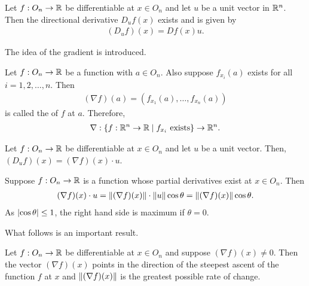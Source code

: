 \begin{theorem}
    Let $f:O_{n} \to \mathbb{R}$ be differentiable at $x \in O_{n}$ and let $u$ be a unit vector in $\mathbb{R}^{n}$. Then the directional derivative $D_{u}f(x)$ exists and is given by
    \begin{align}
        (D_{u}f)(x) = Df(x)u.
    \end{align}
\end{theorem}

The idea of the gradient is introduced.

\begin{definition}
    Let $f:O_{n} \to \mathbb{R}$ be a function with $a \in O_{n}$. Also suppose $f_{x_{i}}(a)$ exists for all $i = 1,2,\ldots,n$. Then
    \begin{align}
        (\nabla f)(a) = (f_{x_{1}}(a),\ldots,f_{x_{n}}(a))
    \end{align}
    is called the  of $f$ at $a$. Therefore,
    \begin{align}
        \nabla:\{f:\mathbb{R}^{n}\to\mathbb{R} \mid f_{x_{i}} \text{ exists}\} \to \mathbb{R}^{n}.
    \end{align}
\end{definition}

\begin{corollary}
    Let $f:O_{n} \to \mathbb{R}$ be differentiable at $x \in O_{n}$ and let $u$ be a unit vector. Then, $(D_{u}f)(x) = (\nabla f)(x) \cdot u$.
\end{corollary}

\begin{remark}
    Suppose $f:O_{n} \to \mathbb{R}$ is a function whose partial derivatives exist at $x \in O_{n}$. Then
    \begin{align}
        (\nabla f)(x) \cdot u = \left\lVert(\nabla f)(x)\right\rVert \cdot \left\lVert u\right\rVert \cos \theta = \left\lVert(\nabla f)(x)\right\rVert \cos \theta.
    \end{align}
    As $\left| \cos \theta \right| \leq 1$, the right hand side is maximum if $\theta = 0$.
\end{remark}

What follows is an important result.

\begin{theorem}
    Let $f:O_{n} \to \mathbb{R}$ be differentiable at $x \in O_{n}$ and suppose $(\nabla f)(x) \neq 0$. Then the vector $(\nabla f)(x)$ points in the direction of the steepest ascent of the function $f$ at $x$ and $\left\lVert(\nabla f)(x)\right\rVert$ is the greatest possible rate of change.
\end{theorem}